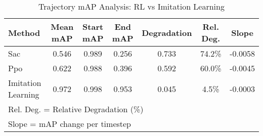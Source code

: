 
\begin{table}[htbp]
\centering
\caption{Trajectory mAP Analysis: RL vs Imitation Learning}
\label{tab:map_trajectory_analysis}
\begin{tabular}{lcccccc}
\toprule
Method & Mean mAP & Start mAP & End mAP & Degradation & Rel. Deg. & Slope \\
\midrule

Sac & 0.546 & 0.989 & 0.256 & 0.733 & 74.2\% & -0.0058 \\
Ppo & 0.622 & 0.988 & 0.396 & 0.592 & 60.0\% & -0.0045 \\
Imitation Learning & 0.972 & 0.998 & 0.953 & 0.045 & 4.5\% & -0.0003 \\

\bottomrule
\multicolumn{7}{l}{\footnotesize Rel. Deg. = Relative Degradation (\%)} \\
\multicolumn{7}{l}{\footnotesize Slope = mAP change per timestep} \\
\end{tabular}
\end{table}
